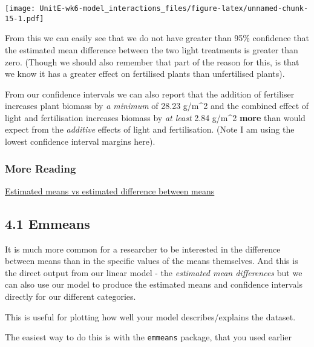 \documentclass[
]{article}
\begin{document}
\texttt{[image: UnitE-wk6-model\_interactions\_files/figure-latex/unnamed-chunk-15-1.pdf]}

From this we can easily see that we do not have greater than 95\%
confidence that the estimated mean difference between the two light
treatments is greater than zero. (Though we should also remember that
part of the reason for this, is that we know it has a greater effect on
fertilised plants than unfertilised plants).

From our confidence intervals we can also report that the addition of
fertiliser increases plant biomass by \emph{a minimum} of 28.23 g/m\^{}2
and the combined effect of light and fertilisation increases biomass by
\emph{at least} 2.84 g/m\^{}2 \textbf{more} than would expect from the
\emph{additive} effects of light and fertilisation. (Note I am using the
lowest confidence interval margins here).

\hypertarget{more-reading}{%
\subsubsection{More Reading}\label{more-reading}}

\href{https://onlinestatbook.com/2/estimation/difference_means.html}{Estimated
means vs estimated difference between means}

\hypertarget{emmeans}{%
\subsection{4.1 Emmeans}\label{emmeans}}

It is much more common for a researcher to be interested in the
difference between means than in the specific values of the means
themselves. And this is the direct output from our linear model - the
\emph{estimated mean differences} but we can also use our model to
produce the estimated means and confidence intervals directly for our
different categories.

This is useful for plotting how well your model describes/explains the
dataset.

The easiest way to do this is with the \texttt{emmeans} package, that
you used earlier
\end{document}
